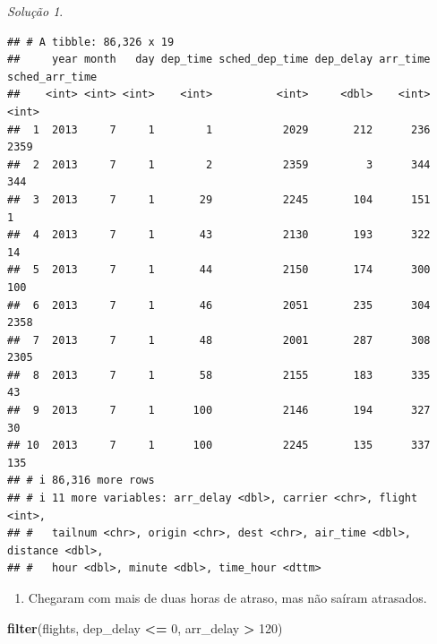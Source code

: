 \documentclass[
]{latex/krantz}
\newenvironment{Shaded}{\begin{snugshade}}{\end{snugshade}}
\newcommand{\DecValTok}[1]{\textcolor[rgb]{0.00,0.00,0.81}{#1}}
\newcommand{\FunctionTok}[1]{\textcolor[rgb]{0.13,0.29,0.53}{\textbf{#1}}}
\newcommand{\NormalTok}[1]{#1}
\newcommand{\SpecialCharTok}[1]{\textcolor[rgb]{0.81,0.36,0.00}{\textbf{#1}}}
\providecommand{\tightlist}{%
  \setlength{\itemsep}{0pt}\setlength{\parskip}{0pt}}
\theoremstyle{definition}
\theoremstyle{definition}
\theoremstyle{definition}
\theoremstyle{definition}
\theoremstyle{remark}
\newtheorem*{solution}{Solução}
\begin{document}
\begin{solution}
\begin{verbatim}
## # A tibble: 86,326 x 19
##     year month   day dep_time sched_dep_time dep_delay arr_time sched_arr_time
##    <int> <int> <int>    <int>          <int>     <dbl>    <int>          <int>
##  1  2013     7     1        1           2029       212      236           2359
##  2  2013     7     1        2           2359         3      344            344
##  3  2013     7     1       29           2245       104      151              1
##  4  2013     7     1       43           2130       193      322             14
##  5  2013     7     1       44           2150       174      300            100
##  6  2013     7     1       46           2051       235      304           2358
##  7  2013     7     1       48           2001       287      308           2305
##  8  2013     7     1       58           2155       183      335             43
##  9  2013     7     1      100           2146       194      327             30
## 10  2013     7     1      100           2245       135      337            135
## # i 86,316 more rows
## # i 11 more variables: arr_delay <dbl>, carrier <chr>, flight <int>,
## #   tailnum <chr>, origin <chr>, dest <chr>, air_time <dbl>, distance <dbl>,
## #   hour <dbl>, minute <dbl>, time_hour <dttm>
\end{verbatim}

\begin{enumerate}
\def\labelenumi{\alph{enumi}.}
\setcounter{enumi}{4}
\tightlist
\item
  Chegaram com mais de duas horas de atraso, mas não saíram atrasados.
\end{enumerate}

\begin{Shaded}
\begin{Highlighting}[]
\FunctionTok{filter}\NormalTok{(flights, dep\_delay }\SpecialCharTok{\textless{}=} \DecValTok{0}\NormalTok{, arr\_delay }\SpecialCharTok{\textgreater{}} \DecValTok{120}\NormalTok{)}
\end{Highlighting}
\end{Shaded}


\end{solution}
\end{document}
